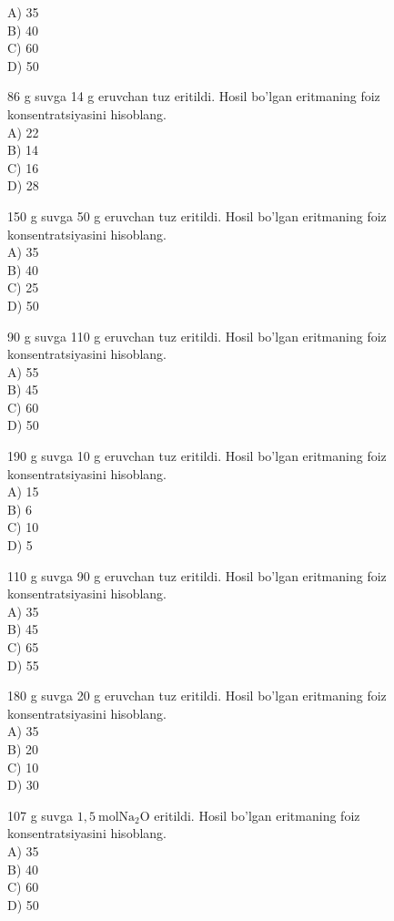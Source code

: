 A) 35\\
B) 40\\
C) 60\\
D) 50
  \item 86 g suvga 14 g eruvchan tuz eritildi. Hosil bo'lgan eritmaning foiz konsentratsiyasini hisoblang.\\
A) 22\\
B) 14\\
C) 16\\
D) 28
  \item 150 g suvga 50 g eruvchan tuz eritildi. Hosil bo'lgan eritmaning foiz konsentratsiyasini hisoblang.\\
A) 35\\
B) 40\\
C) 25\\
D) 50
  \item 90 g suvga 110 g eruvchan tuz eritildi. Hosil bo'lgan eritmaning foiz konsentratsiyasini hisoblang.\\
A) 55\\
B) 45\\
C) 60\\
D) 50
  \item 190 g suvga 10 g eruvchan tuz eritildi. Hosil bo'lgan eritmaning foiz konsentratsiyasini hisoblang.\\
A) 15\\
B) 6\\
C) 10\\
D) 5
  \item 110 g suvga 90 g eruvchan tuz eritildi. Hosil bo'lgan eritmaning foiz konsentratsiyasini hisoblang.\\
A) 35\\
B) 45\\
C) 65\\
D) 55
  \item 180 g suvga 20 g eruvchan tuz eritildi. Hosil bo'lgan eritmaning foiz konsentratsiyasini hisoblang.\\
A) 35\\
B) 20\\
C) 10\\
D) 30
  \item 107 g suvga $1,5 \mathrm{~mol} \mathrm{Na}_{2} \mathrm{O}$ eritildi.
Hosil bo'lgan eritmaning foiz\\
konsentratsiyasini hisoblang.\\
A) 35\\
B) 40\\
C) 60\\
D) 50\\
